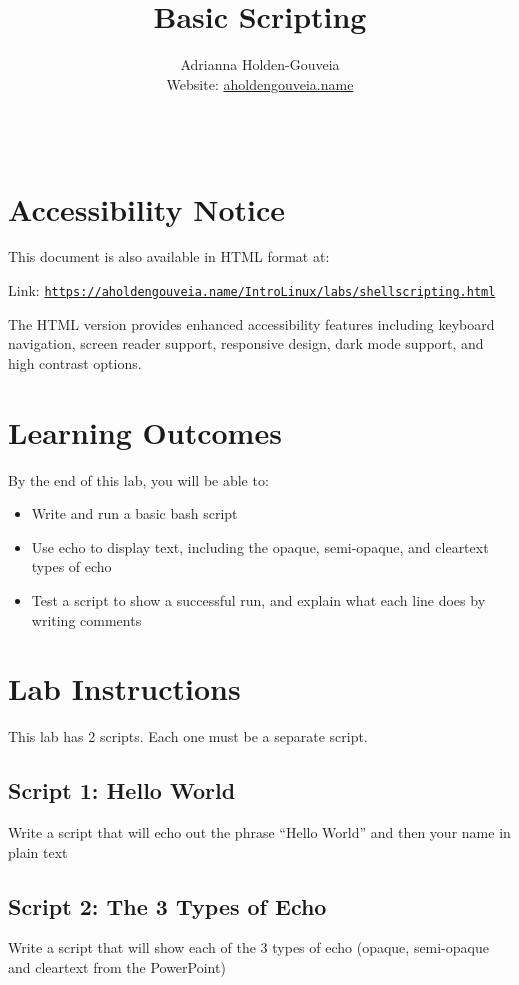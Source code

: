 \documentclass[12pt]{article}
\title{Basic Scripting}
\author{
        Adrianna Holden-Gouveia \\
        Website: \href{https://aholdengouveia.name}{aholdengouveia.name}\\
        \date{\vspace{-5ex}}
        \faGithub {: aholdengouveia} \\
        }
\begin{document}
    

\maketitle

\section*{Accessibility Notice}
This document is also available in HTML format at:

Link: \href{https://aholdengouveia.name/IntroLinux/labs/shellscripting.html}{\nolinkurl{https://aholdengouveia.name/IntroLinux/labs/shellscripting.html}}

The HTML version provides enhanced accessibility features including keyboard navigation, screen reader support, responsive design, dark mode support, and high contrast options.



\section*{Learning Outcomes}
By the end of this lab, you will be able to:
\begin{itemize}
    \item Write and run a basic bash script
    \item Use echo to display text, including the opaque, semi-opaque, and cleartext types of echo
    \item Test a script to show a successful run, and explain what each line does by writing comments
\end{itemize}
\section*{Lab Instructions}
This lab has 2 scripts. Each one must be a separate script.

\subsection*{Script 1: Hello World}
Write a script that will echo out the phrase “Hello World”  and then your name in plain text

\subsection*{Script 2: The 3 Types of Echo}
Write a script that will show each of the 3 types of echo (opaque, semi-opaque and cleartext from the PowerPoint)
\end{document}
